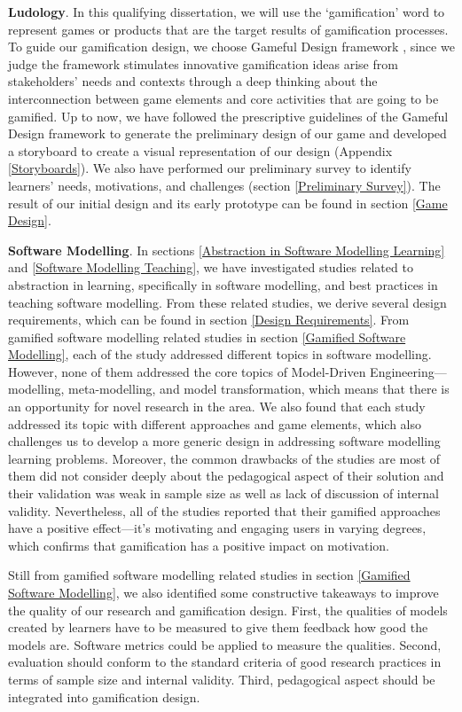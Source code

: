 \documentclass[12pt, a4paper]{report}
\begin{document}
{\textbf{Ludology}. In this qualifying dissertation, we will use the `gamification' word to represent games or products that are the target results of gamification processes. To guide our gamification design, we choose Gameful Design framework \cite{deterding2015lens}, since we judge the framework stimulates innovative gamification ideas arise from stakeholders' needs and contexts through a deep thinking about the interconnection between game elements and core activities that are going to be gamified. Up to now, we have followed the prescriptive guidelines of the Gameful Design framework to generate the preliminary design of our game and developed a storyboard to create a visual representation of our design (Appendix \ref{Storyboards}). We also have performed our preliminary survey to identify learners' needs, motivations, and challenges (section \ref{Preliminary Survey}). The result of our initial design and its early prototype can be found in section \ref{Game Design}.

\textbf{Software Modelling}. In sections \ref{Abstraction in Software Modelling Learning} and \ref{Software Modelling Teaching}, we have investigated studies related to abstraction in learning, specifically in software modelling, and best practices in teaching software modelling. From these related studies, we derive several design requirements, which can be found in section \ref{Design Requirements}.      From gamified software modelling related studies in section \ref{Gamified Software Modelling}, each of the study addressed different topics in software modelling. However, none of them addressed the core topics of Model-Driven Engineering---modelling, meta-modelling, and model transformation, which means that there is an opportunity for novel research in the area. We also found that each study addressed its topic with different approaches and game elements, which also challenges us to develop a more generic design in addressing software modelling learning problems. Moreover, the common drawbacks of the studies are most of them did not consider deeply about the pedagogical aspect of their solution and their validation was weak in sample size as well as lack of discussion of internal validity. Nevertheless, all of the studies reported that their gamified approaches have a positive effect---it's motivating and engaging users in varying degrees, which confirms that gamification has a positive impact on motivation.

Still from gamified software modelling related studies in section \ref{Gamified Software Modelling}, we also identified some constructive takeaways to improve the quality of our research and gamification design. First, the qualities of models created by learners have to be measured to give them feedback how good the models are. Software metrics could be applied to measure the qualities. Second, evaluation should conform to the standard criteria of good research practices in terms of sample size and internal validity. Third, pedagogical aspect should be integrated into gamification design.       

}
\end{document}
